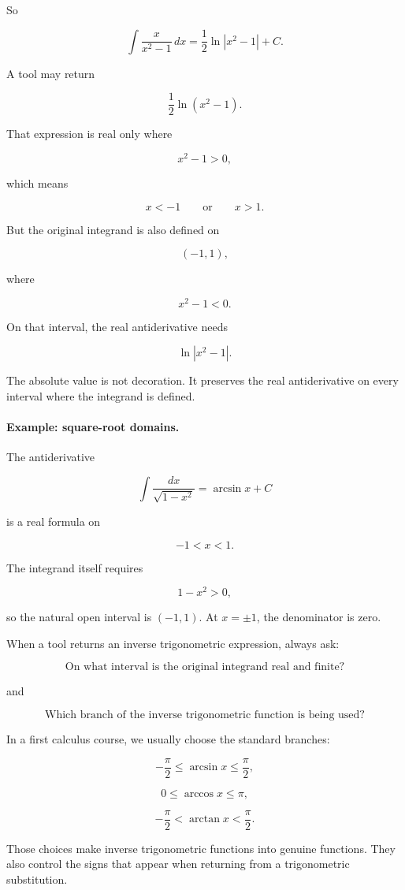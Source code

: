 So

\[
\boxed{
\int \frac{x}{x^2-1}\,dx
=
\frac12\ln|x^2-1|+C.
}
\]

A tool may return

\[
\frac12\ln(x^2-1).
\]

That expression is real only where

\[
x^2-1>0,
\]

which means

\[
x<-1
\qquad\text{or}\qquad
x>1.
\]

But the original integrand is also defined on

\[
(-1,1),
\]

where

\[
x^2-1<0.
\]

On that interval, the real antiderivative needs

\[
\ln|x^2-1|.
\]

The absolute value is not decoration.  It preserves the real antiderivative on every
interval where the integrand is defined.

\paragraph{Example: square-root domains.}
The antiderivative

\[
\int \frac{dx}{\sqrt{1-x^2}}
=
\arcsin x+C
\]

is a real formula on

\[
-1<x<1.
\]

The integrand itself requires

\[
1-x^2>0,
\]

so the natural open interval is \((-1,1)\).  At \(x=\pm1\), the denominator is zero.

When a tool returns an inverse trigonometric expression, always ask:

\[
\text{On what interval is the original integrand real and finite?}
\]

and

\[
\text{Which branch of the inverse trigonometric function is being used?}
\]

In a first calculus course, we usually choose the standard branches:

\[
-\frac{\pi}{2}\le \arcsin x\le \frac{\pi}{2},
\]

\[
0\le \arccos x\le \pi,
\]

\[
-\frac{\pi}{2}<\arctan x<\frac{\pi}{2}.
\]

Those choices make inverse trigonometric functions into genuine functions.  They also
control the signs that appear when returning from a trigonometric substitution.

